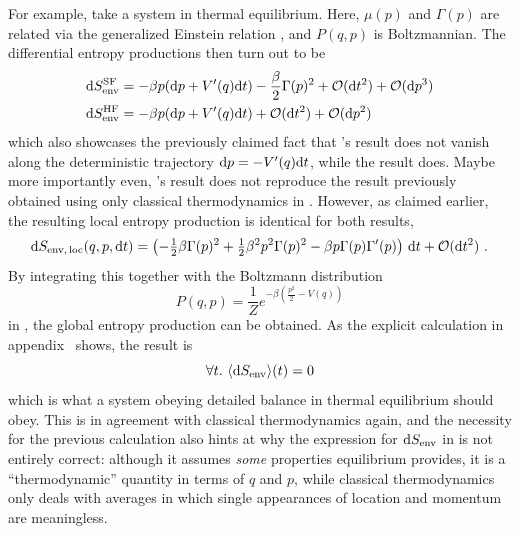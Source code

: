 For example, take a system in thermal equilibrium. Here, \(\mu(p)\) and \(\Gamma(p)\) are related via the generalized Einstein relation , and \(P(q,p)\) is Boltzmannian. The differential entropy productions then turn out to be
%
\begin{align}
	\mathrm{d}S_\text{env}^{\text{SF}} &= -\beta p(\mathrm{d} p + V'(q)\mathrm{d} t) - \frac\beta2\Gamma(p)^2 + \mathcal{O}(\mathrm{d} t^2) + \mathcal{O}(\mathrm{d} p^3) \\
	\mathrm{d}S_\text{env}^{\text{HF}} &= -\beta p(\mathrm{d} p + V'(q)\mathrm{d} t) + \mathcal{O}(\mathrm{d} t^2) + \mathcal{O}(\mathrm{d} p^2)
\end{align}
%
which also showcases the previously claimed fact that \SF's result does not vanish along the deterministic trajectory \(\mathrm{d} p = -V'(q)\mathrm{d} t\), while the \HF{} result does. Maybe more importantly even, \SF's result does not reproduce the result previously obtained using only classical thermodynamics in . However, as claimed earlier, the resulting local entropy production is identical for both results,
%
\begin{equation}
	\mathrm{d}S_\text{env,\,loc}(q,p,\mathrm{d} t) = \left(
		- \tfrac12\beta\Gamma(p)^2
		+ \tfrac12\beta^2p^2\Gamma(p)^2
		- \beta p\Gamma(p)\Gamma'(p)
		\right)\,\mathrm{d} t
		+ \mathcal{O}(\mathrm{d} t^2) ~.
\end{equation}
%
By integrating this together with the Boltzmann distribution
%
\begin{equation}
	P(q,p) = \frac1Z e^{-\beta\left(\frac{p^2}2-V(q)\right)}
\end{equation}
%
in , the global entropy production can be obtained. As the explicit calculation in appendix~ shows, the result is
%
\begin{equation}
	\label{eqn:global entropy 0}
	\forall t. ~ \langle\mathrm{d}S_\text{env}\rangle(t) = 0
\end{equation}
%
which is what a system obeying detailed balance in thermal equilibrium should obey. This is in agreement with classical thermodynamics again, and the necessity for the previous calculation also hints at why the expression for \(\mathrm{d}S_\text{env}\) in  is not entirely correct: although it assumes \emph{some} properties equilibrium provides, it is a ``thermodynamic'' quantity in terms of \(q\) and \(p\), while classical thermodynamics only deals with averages in which single appearances of location and momentum are meaningless.


